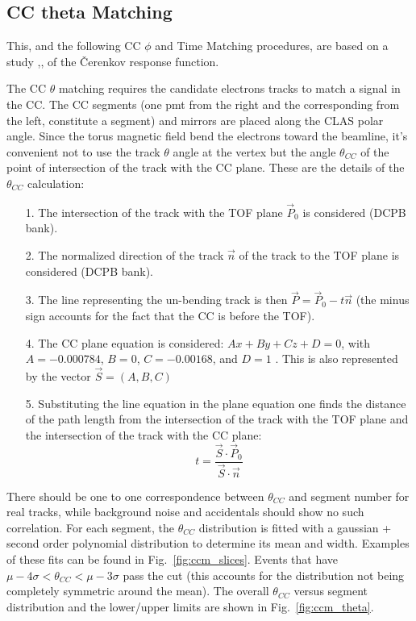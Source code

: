 \clearpage\newpage
\subsection{CC theta Matching}

This, and the following CC $\phi$ and Time Matching procedures, are based on a study
\cite{bib:ccmatch},\cite{bib:pc_fxpun}, \cite{bib:pc_osi} of the \v Cerenkov response function.

The CC $\theta$ matching requires the candidate electrons tracks to match
a signal in the CC. The CC segments (one pmt from the right and the corresponding from the left,
constitute a segment) and mirrors are placed along the CLAS polar angle.
Since the torus magnetic field bend the electrons toward the beamline, it's convenient
not to use the track $\theta$ angle at the vertex but the angle $\theta_{CC}$ of the point of
intersection of the track with the CC plane. These are the details of the  $\theta_{CC}$
calculation:
\begin{itemize}
 \item [1.] The intersection of the track with the TOF plane  $\vec{P}_0$ is considered (DCPB bank).
 \item [2.] The normalized direction of the track $\vec{n}$ of the track to the TOF plane is considered (DCPB bank).
 \item [3.] The line representing the un-bending track is then $\vec{P} = \vec{P}_0 - t\vec{n}$
            (the minus sign accounts for the fact that the CC is before the TOF).
 \item [4.] The CC plane equation is considered: $Ax+By+Cz+D=0$, with
            $A=-0.000784$, $B=0$, $C=-0.00168$, and $D=1$ \cite{bib:ccmatch}. This is also represented
            by the vector $\vec{S} = (A, B, C)$
 \item [5.] Substituting the line equation in the plane equation one finds the distance of the path length from the
	         intersection of the track with the TOF plane and the intersection of the track with the CC plane:
            $$t=\frac{\vec{S} \cdot \vec{P}_0}{\vec{S} \cdot \vec{n}}$$
\end{itemize}
There should be one to one correspondence between $\theta_{CC}$ and segment number for real tracks, while
background noise and accidentals should show no such correlation.
For each segment, the $\theta_{CC}$ distribution is fitted with a gaussian + second order
polynomial distribution to determine its mean and width. Examples of these fits can be found
in Fig.~\ref{fig:ccm_slices}. Events that have $\mu - 4\sigma < \theta_{CC} < \mu - 3\sigma$
pass the cut (this accounts for the distribution not being completely symmetric around the mean).
The overall $\theta_{CC}$ versus segment distribution and the lower/upper limits
are shown in Fig.~\ref{fig:ccm_theta}.

